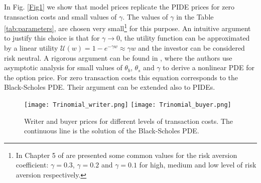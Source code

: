 In Fig. \ref{Fig1} we show that model prices replicate the PIDE prices for zero transaction costs and small values of $\gamma$. 
The values of $\gamma$ in the Table \ref{tab:parameters},
are chosen very small\footnote{ In Chapter 5 of \cite{GK99} are presented some common values for the risk aversion coefficient: $\gamma=0.3$, $\gamma=0.2$ and $\gamma=0.1$ 
for high, medium and low level of risk aversion respectively.} for this purpose. 
An intuitive argument to justify this choice is that for $\gamma \to 0$, the utility function 
can be approximated by a linear utility $\mathcal{U}(w) = 1 - e^{-\gamma w} \approx \gamma w$ and the investor can be considered risk neutral. 
A rigorous argument can be found in \cite{BaSo98}, where the authors use asymptotic analysis for small values of $\theta_b$, $\theta_s$ and $\gamma$ to derive 
a nonlinear PDE for the option price. For zero transaction costs this equation corresponds to the Black-Scholes PDE. 
Their argument can be extended also to PIDEs.
\begin{figure}[t!]
   \centering
   \texttt{[image: Trinomial\_writer.png]}
   \texttt{[image: Trinomial\_buyer.png]}
    \caption{Writer and buyer prices for different levels of transaction costs. The continuous line is the solution of the Black-Scholes PDE.}
   \label{Fig2}
\end{figure}

